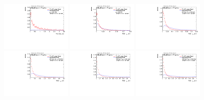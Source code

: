 \begin{figure}
\includegraphics[width=0.3\textwidth]{sascha_input/Appendix/Distributions/w/distributions/beta3/h_assisted_tj_D2_3_bin6.pdf}
\bigskip 
\includegraphics[width=0.3\textwidth]{sascha_input/Appendix/Distributions/w/distributions/beta3/h_assisted_tj_nSub21_3_bin1.pdf} \hspace{1mm}
\includegraphics[width=0.3\textwidth]{sascha_input/Appendix/Distributions/w/distributions/beta3/h_assisted_tj_nSub21_3_bin2.pdf} \hspace{1mm}
\includegraphics[width=0.3\textwidth]{sascha_input/Appendix/Distributions/w/distributions/beta3/h_assisted_tj_nSub21_3_bin3.pdf} 
\bigskip
\includegraphics[width=0.3\textwidth]{sascha_input/Appendix/Distributions/w/distributions/beta3/h_assisted_tj_nSub21_3_bin4.pdf} \hspace{6mm}
\includegraphics[width=0.3\textwidth]{sascha_input/Appendix/Distributions/w/distributions/beta3/h_assisted_tj_nSub21_3_bin5.pdf} \hspace{6mm}

\end{figure}
